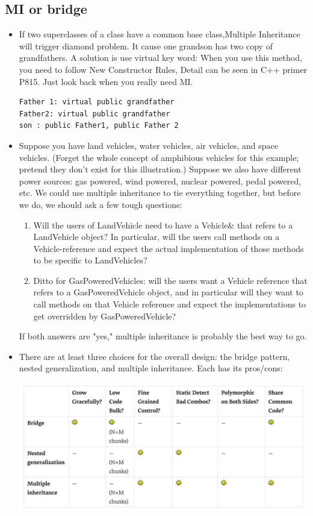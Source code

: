 \documentclass[a4paper,11pt,twoside]{book}
\begin{document}
\subsection{MI or bridge}
\begin{itemize}
    
	\item If two superclasses of a class have a common base class,Multiple Inheritance will trigger diamond problem. It cause one grandson has two copy of grandfathers. A solution is use virtual key word: When you use this method, you need to follow New Constructor Rules, Detail can be seen in C++ primer P815.  Just look back when you really need MI.

\begin{lstlisting}[numbers=none]
Father 1: virtual public grandfather
Father2: virtual public grandfather
son : public Father1, public Father 2
\end{lstlisting}
	
	\item Suppose you have land vehicles, water vehicles, air vehicles, and space vehicles. (Forget the whole concept of amphibious vehicles for this example; pretend they don't exist for this illustration.) Suppose we also have different power sources: gas powered, wind powered, nuclear powered, pedal powered, etc. We could use multiple inheritance to tie everything together, but before we do, we should ask a few tough questions:
	
	\begin{enumerate}
		\item Will the users of LandVehicle need to have a Vehicle\& that refers to a LandVehicle object? In particular, will the users call methods on a Vehicle-reference and expect the actual implementation of those methods to be specific to LandVehicles?
		
		\item Ditto for GasPoweredVehicles: will the users want a Vehicle reference that refers to a GasPoweredVehicle object, and in particular will they want to call methods on that Vehicle reference and expect the implementations to get overridden by GasPoweredVehicle?
	\end{enumerate}
	If both answers are "yes," multiple inheritance is probably the best way to go.
	
	\item There are at least three choices for the overall design: the bridge pattern, nested generalization, and multiple inheritance. Each has its pros/cons:
\begin{center}
	\includegraphics[scale=0.4]{pics/MI.png}
\end{center}
	

\end{itemize}
\end{document}
